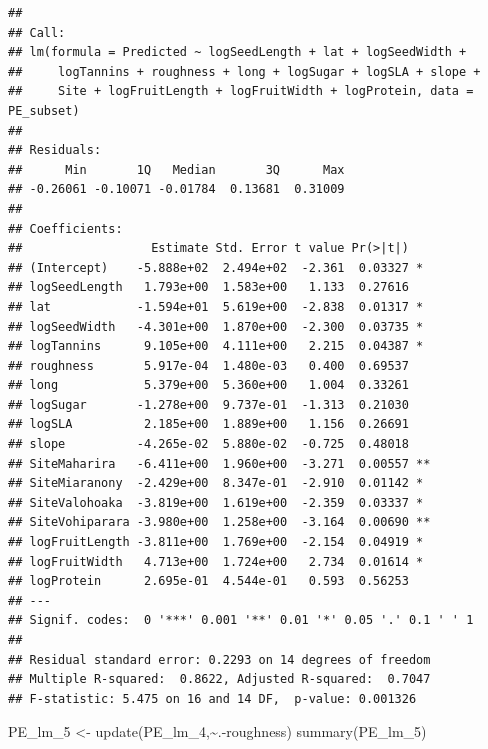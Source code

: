 \documentclass[
  12pt,
]{article}
\newenvironment{Shaded}{\begin{snugshade}}{\end{snugshade}}
\newcommand{\FunctionTok}[1]{\textcolor[rgb]{0.00,0.00,0.00}{#1}}
\newcommand{\NormalTok}[1]{#1}
\newcommand{\OtherTok}[1]{\textcolor[rgb]{0.56,0.35,0.01}{#1}}
\newcommand{\SpecialCharTok}[1]{\textcolor[rgb]{0.00,0.00,0.00}{#1}}
\begin{document}
\begin{verbatim}
## 
## Call:
## lm(formula = Predicted ~ logSeedLength + lat + logSeedWidth + 
##     logTannins + roughness + long + logSugar + logSLA + slope + 
##     Site + logFruitLength + logFruitWidth + logProtein, data = PE_subset)
## 
## Residuals:
##      Min       1Q   Median       3Q      Max 
## -0.26061 -0.10071 -0.01784  0.13681  0.31009 
## 
## Coefficients:
##                  Estimate Std. Error t value Pr(>|t|)   
## (Intercept)    -5.888e+02  2.494e+02  -2.361  0.03327 * 
## logSeedLength   1.793e+00  1.583e+00   1.133  0.27616   
## lat            -1.594e+01  5.619e+00  -2.838  0.01317 * 
## logSeedWidth   -4.301e+00  1.870e+00  -2.300  0.03735 * 
## logTannins      9.105e+00  4.111e+00   2.215  0.04387 * 
## roughness       5.917e-04  1.480e-03   0.400  0.69537   
## long            5.379e+00  5.360e+00   1.004  0.33261   
## logSugar       -1.278e+00  9.737e-01  -1.313  0.21030   
## logSLA          2.185e+00  1.889e+00   1.156  0.26691   
## slope          -4.265e-02  5.880e-02  -0.725  0.48018   
## SiteMaharira   -6.411e+00  1.960e+00  -3.271  0.00557 **
## SiteMiaranony  -2.429e+00  8.347e-01  -2.910  0.01142 * 
## SiteValohoaka  -3.819e+00  1.619e+00  -2.359  0.03337 * 
## SiteVohiparara -3.980e+00  1.258e+00  -3.164  0.00690 **
## logFruitLength -3.811e+00  1.769e+00  -2.154  0.04919 * 
## logFruitWidth   4.713e+00  1.724e+00   2.734  0.01614 * 
## logProtein      2.695e-01  4.544e-01   0.593  0.56253   
## ---
## Signif. codes:  0 '***' 0.001 '**' 0.01 '*' 0.05 '.' 0.1 ' ' 1
## 
## Residual standard error: 0.2293 on 14 degrees of freedom
## Multiple R-squared:  0.8622, Adjusted R-squared:  0.7047 
## F-statistic: 5.475 on 16 and 14 DF,  p-value: 0.001326
\end{verbatim}

\begin{Shaded}
\begin{Highlighting}[]
\NormalTok{PE\_lm\_5 }\OtherTok{\textless{}{-}} \FunctionTok{update}\NormalTok{(PE\_lm\_4,}\SpecialCharTok{\textasciitilde{}}\NormalTok{.}\SpecialCharTok{{-}}\NormalTok{roughness)}
\FunctionTok{summary}\NormalTok{(PE\_lm\_5)}
\end{Highlighting}
\end{Shaded}
\end{document}
